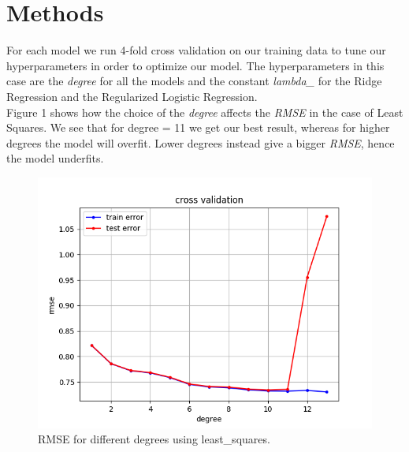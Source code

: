 \documentclass[10pt,conference,compsocconf]{IEEEtran}
\begin{document}
\section{Methods}
\label{sec:tips-writing}


For each model we run 4-fold cross validation on our training data to tune our hyperparameters in order to optimize our model. The hyperparameters in this case are the \textit{degree} for all the models and the constant \textit{lambda\_} for the Ridge Regression and the Regularized Logistic Regression.
\\
Figure 1 shows how the choice of the \textit{degree} affects the \textit{RMSE} in the case of Least Squares. We see that for degree = 11 we get our best result, whereas for higher degrees the model will overfit. Lower degrees instead give a bigger \textit{RMSE}, hence the model underfits.



\begin{figure}[htbp]
  \centering
  \includegraphics[width=\columnwidth]{cross_validation_leastsquares.png}
  \caption{RMSE for different degrees using least\_squares.}
  \vspace{-3mm}
  \label{fig:crossvalidationleastsquares}
\end{figure}
\end{document}
